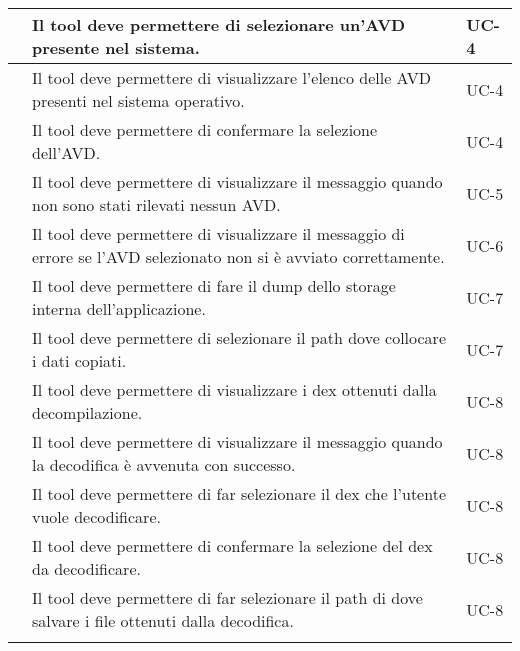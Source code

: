 \begin{longtable}{ | c| C{7cm} |C{3cm} |}
        & Il tool deve permettere di selezionare un'AVD presente nel sistema.                                                   & UC-4           \\\hline
        & Il tool deve permettere di visualizzare l'elenco delle AVD presenti nel sistema operativo.                            & UC-4           \\\hline
        & Il tool deve permettere di confermare la selezione dell'AVD.                                                          & UC-4           \\\hline
    \setcounter{subCount}{0}

           & Il tool deve permettere di visualizzare il messaggio quando non sono stati rilevati nessun AVD.                       & UC-5           \\\hline
           & Il tool deve permettere di visualizzare il messaggio di errore se l'AVD selezionato non si è avviato correttamente.   & UC-6           \\\hline
           & Il tool deve permettere di fare il dump dello storage interna dell'applicazione.                                      & UC-7           \\\hline
        & Il tool deve permettere di selezionare il path dove collocare i dati copiati.                                         & UC-7           \\\hline
    \setcounter{subCount}{0}

           & Il tool deve permettere di visualizzare i dex ottenuti dalla decompilazione.                                          & UC-8           \\\hline
        & Il tool deve permettere di visualizzare il messaggio quando la decodifica è avvenuta con successo.                    & UC-8           \\\hline
        & Il tool deve permettere di far selezionare il dex che l'utente vuole decodificare.                                    & UC-8           \\\hline
        & Il tool deve permettere di confermare la selezione del dex da decodificare.                                           & UC-8           \\\hline
        & Il tool deve permettere di far selezionare il path di dove salvare i file ottenuti dalla decodifica.                  & UC-8           \\\hline
    \setcounter{subCount}{0}


\end{longtable}
